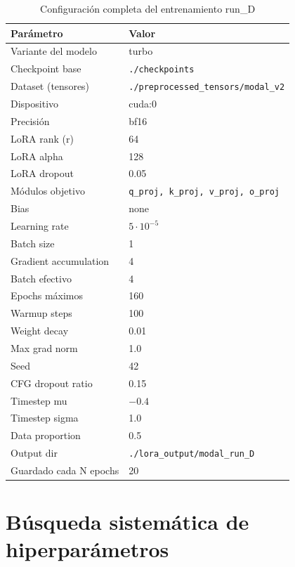 \documentclass[%
    school=etsisi,%
    type=pfg,%
    degree=61CD,%
]{upm-report}
\begin{document}
\begin{table}[htbp]
    \centering
    \caption{Configuraci\'on completa del entrenamiento run\_D}
    \label{tab:run-d-config}
    \small
    \begin{tabular}{lp{7cm}}
        \toprule
        \textbf{Par\'ametro} & \textbf{Valor} \\
        \midrule
        Variante del modelo & turbo \\
        Checkpoint base & \texttt{./checkpoints} \\
        Dataset (tensores) & \texttt{./preprocessed\_tensors/modal\_v2} \\
        Dispositivo & cuda:0 \\
        Precisi\'on & bf16 \\
        \midrule
        LoRA rank (r) & 64 \\
        LoRA alpha & 128 \\
        LoRA dropout & 0.05 \\
        M\'odulos objetivo & \texttt{q\_proj, k\_proj, v\_proj, o\_proj} \\
        Bias & none \\
        \midrule
        Learning rate & $5 \cdot 10^{-5}$ \\
        Batch size & 1 \\
        Gradient accumulation & 4 \\
        Batch efectivo & 4 \\
        Epochs m\'aximos & 160 \\
        Warmup steps & 100 \\
        Weight decay & 0.01 \\
        Max grad norm & 1.0 \\
        Seed & 42 \\
        \midrule
        CFG dropout ratio & 0.15 \\
        Timestep mu & $-0.4$ \\
        Timestep sigma & 1.0 \\
        Data proportion & 0.5 \\
        \midrule
        Output dir & \texttt{./lora\_output/modal\_run\_D} \\
        Guardado cada N epochs & 20 \\
        \bottomrule
    \end{tabular}
\end{table}

\section{B\'usqueda sistem\'atica de hiperpar\'ametros}
\label{s:stage1-sweep}
\end{document}
